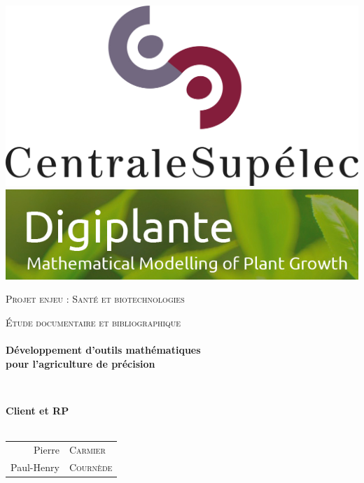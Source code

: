 \begin{titlepage}
\begin{center}

\includegraphics[scale=0.5]{./img/logo_centralesup.jpg} \hfill
\includegraphics[scale=0.3]{./img/logo_digiplante.png}

\vfill 

\textsc{\Large Projet enjeu : Santé et biotechnologies}\\[0.5cm]

\vfill

\textsc{\Large \'Etude documentaire et bibliographique}\\[1.5cm] 

\HRule \\[0.4cm]
{ \LARGE \bfseries Développement d'outils mathématiques \\ 
   pour l'agriculture de précision \\[0.4cm] }

\HRule \\[1.5cm]

\vfill

{\large
\begin{center}
  \textbf{Client et RP} \\~\\
\begin{tabular}{rl}
   \quad Pierre &\textsc{Carmier} \\
    \quad Paul-Henry &\textsc{Courn\`ede} \\
  

\end{tabular}
\end{center}}
\end{center}
\end{titlepage}
